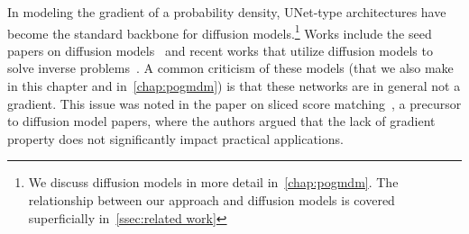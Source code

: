 In modeling the gradient of a probability density, UNet-type architectures have become the standard backbone for diffusion models.\footnote{%
	We discuss diffusion models in more detail in~\cref{chap:pogmdm}. The relationship between our approach and diffusion models is covered superficially in~\cref{ssec:related work}
}
Works include the seed papers on diffusion models~\cite{song_generative_2019,song2021scorebased} and recent works that utilize diffusion models to solve inverse problems~\cite{chung_scoremri_2022,jalal_robust_comporessed_2021,chung2023solving,chung2023diffusion}.
A common criticism of these models (that we also make in this chapter and in~\cref{chap:pogmdm}) is that these networks are in general not a gradient.
This issue was noted in the paper on sliced score matching~\cite[footnote 1 on page 4]{song2020sliced}, a precursor to diffusion model papers, where the authors argued that the lack of gradient property does not significantly impact practical applications.

